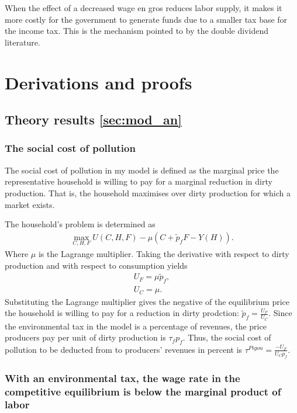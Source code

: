 When the effect of a decreased wage  en gros reduces labor supply, it makes it more costly for the government to generate funds due to a smaller tax base for the income tax. This is the mechanism pointed to by the double dividend literature.
\section{Derivations and proofs}\label{app:derivations}

\subsection{Theory results \ref{sec:mod_an}}
\subsubsection{The social cost of pollution}

The social cost of pollution in my model is defined as the marginal price the representative household is willing to pay for a marginal reduction in dirty production. That is, the household maximises over dirty production for which a market exists.

The household's problem is determined as
\begin{align}
\underset{C,H,F}{\max} U(C,H,F)-\mu \left(C+\tilde{p}_fF-Y(H)\right).
\end{align}
Where $\mu$ is the Lagrange multiplier. Taking the derivative with respect to dirty production  and with respect to consumption yields
\begin{align}
U_F=\mu \tilde{p}_f,\\
U_C=\mu.
\end{align}
Substituting the Lagrange multiplier gives the negative of the equilibrium price the household is willing to pay for a reduction in dirty prodction: $\tilde{p}_f=\frac{U_F}{U_C}$. Since the environmental tax in the model is a percentage of revenues, the price producers pay per unit of dirty production is $\tau_f p_f$. Thus, the social cost of pollution to be deducted from to producers' revenues in percent is $\tau^{Pigou}=\frac{-U_F}{U_Cp_f}$.
\subsubsection{With an environmental tax, the wage rate in the competitive equilibrium is below the marginal product of labor}\label{app:wageMPL}


